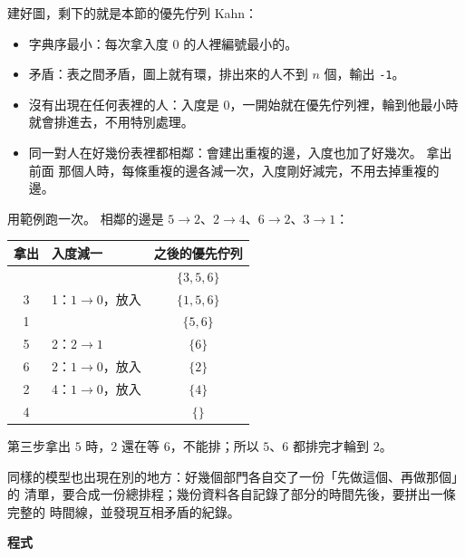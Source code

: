 建好圖，剩下的就是本節的優先佇列 Kahn：

\begin{itemize}
\item 字典序最小：每次拿入度 $0$ 的人裡編號最小的。
\item 矛盾：表之間矛盾，圖上就有環，排出來的人不到 $n$ 個，輸出 \texttt{-1}。
\item 沒有出現在任何表裡的人：入度是 $0$，一開始就在優先佇列裡，輪到他最小時
就會排進去，不用特別處理。
\item 同一對人在好幾份表裡都相鄰：會建出重複的邊，入度也加了好幾次。 拿出前面
那個人時，每條重複的邊各減一次，入度剛好減完，不用去掉重複的邊。
\end{itemize}

用範例跑一次。 相鄰的邊是 $5 \to 2$、$2 \to 4$、$6 \to 2$、$3 \to 1$：

\begin{center}
\begin{tabular}{clc}
\toprule
拿出 & 入度減一 & 之後的優先佇列 \\
\midrule
 & & $\{3, 5, 6\}$ \\
3 & 1：$1 \to 0$，放入 & $\{1, 5, 6\}$ \\
1 & & $\{5, 6\}$ \\
5 & 2：$2 \to 1$ & $\{6\}$ \\
6 & 2：$1 \to 0$，放入 & $\{2\}$ \\
2 & 4：$1 \to 0$，放入 & $\{4\}$ \\
4 & & $\{\}$ \\
\bottomrule
\end{tabular}
\end{center}

第三步拿出 $5$ 時，$2$ 還在等 $6$，不能排；所以 $5$、$6$ 都排完才輪到 $2$。

同樣的模型也出現在別的地方：好幾個部門各自交了一份「先做這個、再做那個」的
清單，要合成一份總排程；幾份資料各自記錄了部分的時間先後，要拼出一條完整的
時間線，並發現互相矛盾的紀錄。

\textbf{程式}


